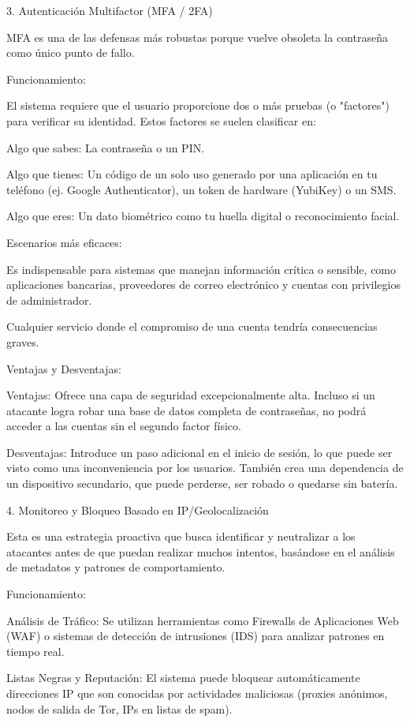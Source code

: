 \documentclass[letterpaper,12pt]{article}
\begin{document}
3. Autenticación Multifactor (MFA / 2FA)

MFA es una de las defensas más robustas porque vuelve obsoleta la contraseña como único punto de fallo.

    Funcionamiento:

        El sistema requiere que el usuario proporcione dos o más pruebas (o "factores") para verificar su identidad. Estos factores se suelen clasificar en:

            Algo que sabes: La contraseña o un PIN.

            Algo que tienes: Un código de un solo uso generado por una aplicación en tu teléfono (ej. Google Authenticator), un token de hardware (YubiKey) o un SMS.

            Algo que eres: Un dato biométrico como tu huella digital o reconocimiento facial.

    Escenarios más eficaces:

        Es indispensable para sistemas que manejan información crítica o sensible, como aplicaciones bancarias, proveedores de correo electrónico y cuentas con privilegios de administrador.

        Cualquier servicio donde el compromiso de una cuenta tendría consecuencias graves.

    Ventajas y Desventajas:

        Ventajas: Ofrece una capa de seguridad excepcionalmente alta. Incluso si un atacante logra robar una base de datos completa de contraseñas, no podrá acceder a las cuentas sin el segundo factor físico.

        Desventajas: Introduce un paso adicional en el inicio de sesión, lo que puede ser visto como una inconveniencia por los usuarios. También crea una dependencia de un dispositivo secundario, que puede perderse, ser robado o quedarse sin batería.

4. Monitoreo y Bloqueo Basado en IP/Geolocalización

Esta es una estrategia proactiva que busca identificar y neutralizar a los atacantes antes de que puedan realizar muchos intentos, basándose en el análisis de metadatos y patrones de comportamiento.

    Funcionamiento:

        Análisis de Tráfico: Se utilizan herramientas como Firewalls de Aplicaciones Web (WAF) o sistemas de detección de intrusiones (IDS) para analizar patrones en tiempo real.

        Listas Negras y Reputación: El sistema puede bloquear automáticamente direcciones IP que son conocidas por actividades maliciosas (proxies anónimos, nodos de salida de Tor, IPs en listas de spam).
\end{document}

